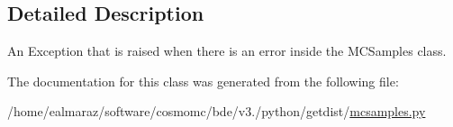 \subsection{Detailed Description}
\begin{DoxyVerb}An Exception that is raised when there is an error inside the MCSamples class.
\end{DoxyVerb}
 

The documentation for this class was generated from the following file\+:\begin{DoxyCompactItemize}
\item 
/home/ealmaraz/software/cosmomc/bde/v3./python/getdist/\mbox{\hyperlink{mcsamples_8py}{mcsamples.\+py}}\end{DoxyCompactItemize}
